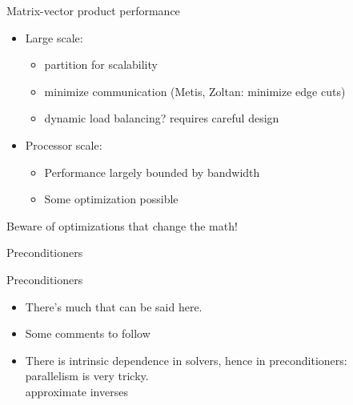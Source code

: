 \begin{frame}{Matrix-vector product performance}
  \begin{itemize}
  \item Large scale:
    \begin{itemize}
    \item partition for scalability
    \item minimize communication (Metis, Zoltan: minimize edge cuts)
    \item dynamic load balancing? requires careful design
    \end{itemize}
  \item Processor scale: 
    \begin{itemize}
    \item Performance largely bounded by bandwidth
    \item Some optimization possible
    \end{itemize}
  \end{itemize}
  Beware of optimizations that change the math!
\end{frame}

 {Preconditioners}

\begin{frame}{Preconditioners}
  \begin{itemize}
  \item There's much that can be said here.
  \item Some comments to follow
  \item There is intrinsic dependence in solvers, hence in preconditioners:\\
    parallelism is very tricky.\\
    approximate inverses
  \end{itemize}
\end{frame}

